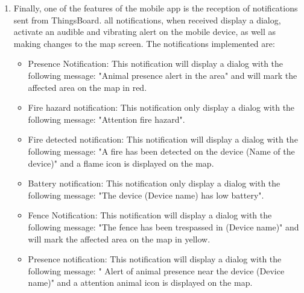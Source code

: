 \begin{enumerate}
    \item Finally, one of the features of the mobile app is the reception of notifications sent from ThingsBoard. all notifications, when received display a dialog, 
    activate an audible and vibrating alert on the mobile device, as well as making changes to the map screen. The notifications implemented are:
    \begin{itemize}
        \item Presence Notification: This notification will display a dialog with the following message: "Animal presence alert in the area" and will mark the affected area on the map in red.
        \item Fire hazard notification: This notification only display a dialog with the following message: "Attention fire hazard".
        \item Fire detected notification: This notification will display a dialog with the following message: "A fire has been detected on the device (Name of the device)" and a flame icon is displayed on the map.
        \item Battery notification: This notification only display a dialog with the following message: "The device (Device name) has low battery".
        \item Fence Notification: This notification will display a dialog with the following message: "The fence has been trespassed in (Device name)" and will mark the affected area on the map in yellow.
        \item Presence notification: This notification will display a dialog with the following message: " Alert of animal presence near the device (Device name)" and a attention animal icon is displayed on the map.
    \end{itemize}


\end{enumerate}
